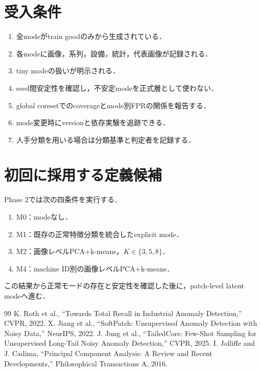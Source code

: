 \documentclass[a4paper,11pt]{ltjsarticle}
\begin{document}
\section{受入条件}
\begin{enumerate}
  \item 全modeがtrain goodのみから生成されている．
  \item 各modeに画像，系列，設備，統計，代表画像が記録される．
  \item tiny modeの扱いが明示される．
  \item seed間安定性を確認し，不安定modeを正式層として使わない．
  \item global coresetでのcoverageとmode別FPRの関係を報告する．
  \item mode変更時にversionと依存実験を追跡できる．
  \item 人手分類を用いる場合は分類基準と判定者を記録する．
\end{enumerate}

\section{初回に採用する定義候補}
Phase 2では次の四条件を実行する．
\begin{enumerate}
  \item M0：modeなし．
  \item M1：既存の正常特徴分類を統合したexplicit mode．
  \item M2：画像レベルPCA+k-means，$K\in\{3,5,8\}$．
  \item M4：machine ID別の画像レベルPCA+k-means．
\end{enumerate}
この結果から正常モードの存在と安定性を確認した後に，patch-level latent modeへ進む．

\begin{thebibliography}{99}
 K. Roth et al., ``Towards Total Recall in Industrial Anomaly Detection,'' CVPR, 2022.
 X. Jiang et al., ``SoftPatch: Unsupervised Anomaly Detection with Noisy Data,'' NeurIPS, 2022.
 J. Jung et al., ``TailedCore: Few-Shot Sampling for Unsupervised Long-Tail Noisy Anomaly Detection,'' CVPR, 2025.
 I. Jolliffe and J. Cadima, ``Principal Component Analysis: A Review and Recent Developments,'' Philosophical Transactions A, 2016.
\end{thebibliography}
\end{document}
